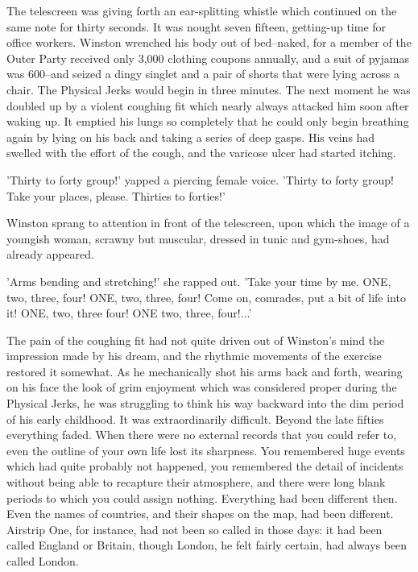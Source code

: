 \documentclass{article}
\begin{document}
The telescreen was giving forth an ear-splitting whistle which continued on
the same note for thirty seconds. It was nought seven fifteen, getting-up
time for office workers. Winston wrenched his body out of bed--naked, for
a member of the Outer Party received only 3,000 clothing coupons annually,
and a suit of pyjamas was 600--and seized a dingy singlet and a pair of
shorts that were lying across a chair. The Physical Jerks would begin in
three minutes. The next moment he was doubled up by a violent coughing fit
which nearly always attacked him soon after waking up. It emptied his lungs
so completely that he could only begin breathing again by lying on his back
and taking a series of deep gasps. His veins had swelled with the effort of
the cough, and the varicose ulcer had started itching.

'Thirty to forty group!' yapped a piercing female voice. 'Thirty to forty
group! Take your places, please. Thirties to forties!'

Winston sprang to attention in front of the telescreen, upon which the
image of a youngish woman, scrawny but muscular, dressed in tunic and
gym-shoes, had already appeared.

'Arms bending and stretching!' she rapped out. 'Take your time by me. ONE,
two, three, four! ONE, two, three, four! Come on, comrades, put a bit of
life into it! ONE, two, three four! ONE two, three, four!...'

The pain of the coughing fit had not quite driven out of Winston's mind the
impression made by his dream, and the rhythmic movements of the exercise
restored it somewhat. As he mechanically shot his arms back and forth,
wearing on his face the look of grim enjoyment which was considered proper
during the Physical Jerks, he was struggling to think his way backward into
the dim period of his early childhood. It was extraordinarily difficult.
Beyond the late fifties everything faded. When there were no external
records that you could refer to, even the outline of your own life lost
its sharpness. You remembered huge events which had quite probably not
happened, you remembered the detail of incidents without being able to
recapture their atmosphere, and there were long blank periods to which you
could assign nothing. Everything had been different then. Even the names of
countries, and their shapes on the map, had been different. Airstrip One,
for instance, had not been so called in those days: it had been called
England or Britain, though London, he felt fairly certain, had always been
called London.
\end{document}
